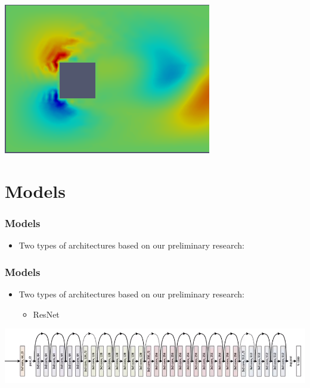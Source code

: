\documentclass[18pt]{beamer}
\begin{document}
\begin{frame}[t]
\begin{center}
    \includegraphics[scale=0.27]{images/y-direction-rgb} \\
  \end{center}
  
\end{frame}

\section{Models}
\begin{frame}[t]
  \frametitle{Models}
  \begin{itemize}
  \item Two types of architectures based on our preliminary research:
  \end{itemize}
\end{frame}


\begin{frame}[t]
  \frametitle{Models}
  \begin{itemize}
  \item Two types of architectures based on our preliminary research:
    \begin{itemize}
    \item ResNet 
    \end{itemize}
  \end{itemize}

  \vspace{1cm}
  \begin{center}
      \includegraphics[scale=0.37]{images/nets/res}
    \end{center}
\end{frame}
\end{document}
